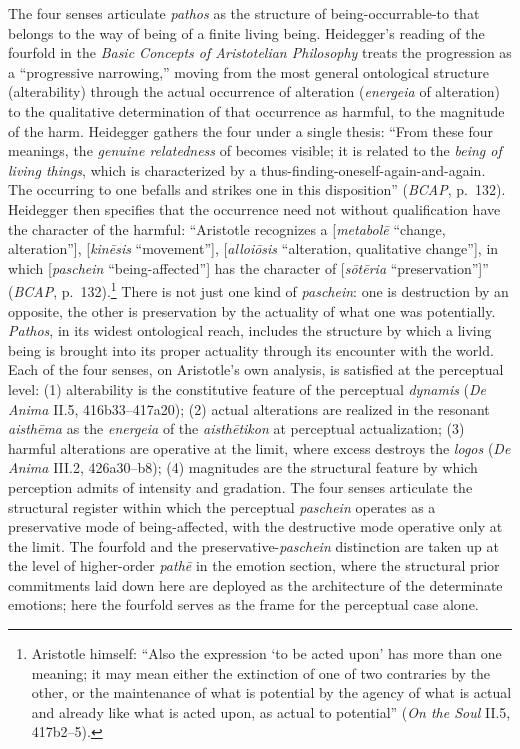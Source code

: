 The four senses articulate \textit{pathos} as the structure of being-occurrable-to that belongs to the way of being of a finite living being. Heidegger's reading of the fourfold in the \textit{Basic Concepts of Aristotelian Philosophy} treats the progression as a ``progressive narrowing,'' moving from the most general ontological structure (alterability) through the actual occurrence of alteration (\textit{energeia} of alteration) to the qualitative determination of that occurrence as harmful, to the magnitude of the harm. Heidegger gathers the four under a single thesis: ``From these four meanings, the \textit{genuine relatedness} of  becomes visible; it is related to the \textit{being of living things}, which is characterized by a thus-finding-oneself-again-and-again. The occurring to one befalls and strikes one in this disposition'' (\textit{BCAP}, p.~132). Heidegger then specifies that the occurrence need not without qualification have the character of the harmful: ``Aristotle recognizes a  [\textit{metabolē} ``change, alteration''],  [\textit{kinēsis} ``movement''],  [\textit{alloiōsis} ``alteration, qualitative change''], in which  [\textit{paschein} ``being-affected''] has the character of  [\textit{sōtēria} ``preservation'']'' (\textit{BCAP}, p.~132).\footnote{Aristotle himself: ``Also the expression `to be acted upon' has more than one meaning; it may mean either the extinction of one of two contraries by the other, or the maintenance of what is potential by the agency of what is actual and already like what is acted upon, as actual to potential'' (\textit{On the Soul} II.5, 417b2--5).} There is not just one kind of \textit{paschein}: one is destruction by an opposite, the other is preservation by the actuality of what one was potentially. \textit{Pathos}, in its widest ontological reach, includes the structure by which a living being is brought into its proper actuality through its encounter with the world. Each of the four senses, on Aristotle's own analysis, is satisfied at the perceptual level: (1) alterability is the constitutive feature of the perceptual \textit{dynamis} (\textit{De Anima} II.5, 416b33--417a20); (2) actual alterations are realized in the resonant \textit{aisthēma} as the \textit{energeia} of the \textit{aisthētikon} at perceptual actualization; (3) harmful alterations are operative at the limit, where excess destroys the \textit{logos} (\textit{De Anima} III.2, 426a30--b8); (4) magnitudes are the structural feature by which perception admits of intensity and gradation. The four senses articulate the structural register within which the perceptual \textit{paschein} operates as a preservative mode of being-affected, with the destructive mode operative only at the limit. The fourfold and the preservative-\textit{paschein} distinction are taken up at the level of higher-order \textit{pathē} in the emotion section, where the structural prior commitments laid down here are deployed as the architecture of the determinate emotions; here the fourfold serves as the frame for the perceptual case alone.

